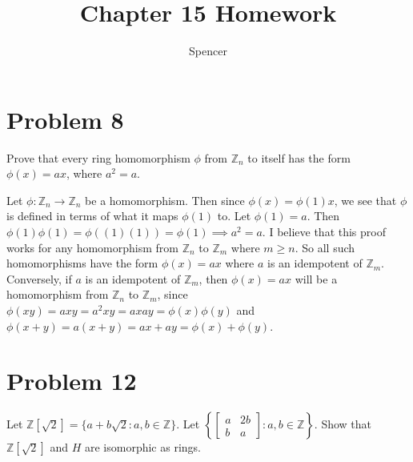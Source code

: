 \documentclass{article}
\title{Chapter 15 Homework}
\author{Spencer}
\begin{document}
\maketitle

\newcommand{\Z}{\mathbb{Z}}
\newcommand{\R}{\mathbb{R}}
\newcommand{\N}{\mathbb{N}}
\newcommand{\lcm}{\mbox{lcm}}

\section*{Problem 8}

Prove that every ring homomorphism $\phi$ from $\Z_n$ to itself
has the form $\phi(x)=ax$, where $a^2=a$.

Let $\phi:\Z_n\to\Z_n$ be a homomorphism.  Then since
$\phi(x)=\phi(1)x$, we see that $\phi$ is defined in terms of
what it maps $\phi(1)$ to.  Let $\phi(1)=a$.
Then $\phi(1)\phi(1)=\phi((1)(1))=\phi(1)\implies a^2=a$.
I believe that this proof works for any homomorphism from $\Z_n$
to $\Z_m$ where $m\geq n$.  So all such homomorphisms have the form $\phi(x)=ax$
where $a$ is an idempotent of $\Z_m$.  Conversely, if $a$ is an idempotent
of $\Z_m$, then $\phi(x)=ax$ will be a homomorphism from $\Z_n$ to $\Z_m$,
since $\phi(xy)=axy=a^2xy=axay=\phi(x)\phi(y)$ and
$\phi(x+y)=a(x+y)=ax+ay=\phi(x)+\phi(y)$.

\section*{Problem 12}

Let $\Z[\sqrt{2}]=\{a+b\sqrt{2}:a,b\in\Z\}$.  Let
$\left\{\left[\begin{array}{cc}a&2b\\b&a\end{array}\right]:a,b\in\Z\right\}$.
Show that $\Z[\sqrt{2}]$ and $H$ are isomorphic as rings.
\end{document}
